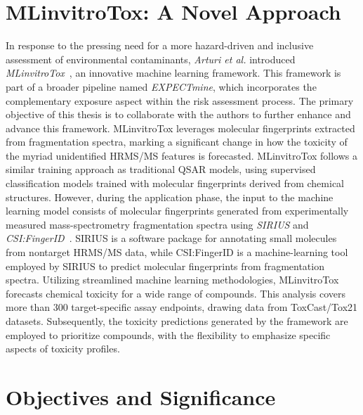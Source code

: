 \section{MLinvitroTox: A Novel Approach}

In response to the pressing need for a more hazard-driven and inclusive assessment of environmental contaminants, \emph{Arturi et al.} introduced \emph{MLinvitroTox}~\cite{arturi}, an innovative machine learning framework. This framework is part of a broader pipeline named \emph{EXPECTmine}, which incorporates the complementary exposure aspect within the risk assessment process. The primary objective of this thesis is to collaborate with the authors to further enhance and advance this framework. MLinvitroTox leverages molecular fingerprints extracted from fragmentation spectra, marking a significant change in how the toxicity of the myriad unidentified HRMS/MS features is forecasted. MLinvitroTox follows a similar training approach as traditional QSAR models, using supervised classification models trained with molecular fingerprints derived from chemical structures. However, during the application phase, the input to the machine learning model consists of molecular fingerprints generated from experimentally measured mass-spectrometry fragmentation spectra using \emph{SIRIUS} and \emph{CSI:FingerID}~\cite{sirius2019}. SIRIUS is a software package for annotating small molecules from nontarget HRMS/MS data, while CSI:FingerID is a machine-learning tool employed by SIRIUS to predict molecular fingerprints from fragmentation spectra. Utilizing streamlined machine learning methodologies, MLinvitroTox forecasts chemical toxicity for a wide range of compounds. This analysis covers more than 300 target-specific assay endpoints, drawing data from ToxCast/Tox21 datasets. Subsequently, the toxicity predictions generated by the framework are employed to prioritize compounds, with the flexibility to emphasize specific aspects of toxicity profiles.

\section{Objectives and Significance}

